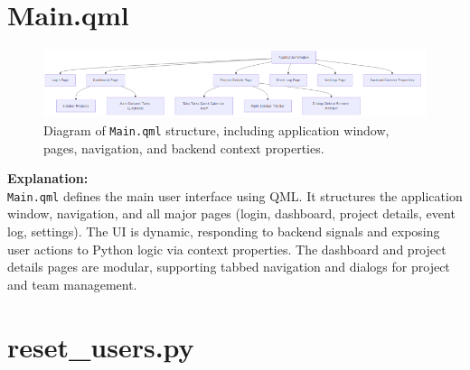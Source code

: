 \documentclass{report}
\begin{document}
\section{Main.qml}

\begin{figure}[ht]
    \centering
    \includegraphics[width=\textwidth]{png_files/main_qml_architecture.png}
    \caption{Diagram of \texttt{Main.qml} structure, including application window, pages, navigation, and backend context properties.}
\end{figure}

\noindent
\textbf{Explanation:} \\
\texttt{Main.qml} defines the main user interface using QML. It structures the application window, navigation, and all major pages (login, dashboard, project details, event log, settings). The UI is dynamic, responding to backend signals and exposing user actions to Python logic via context properties. The dashboard and project details pages are modular, supporting tabbed navigation and dialogs for project and team management.

\section{reset\_users.py}
\end{document}
